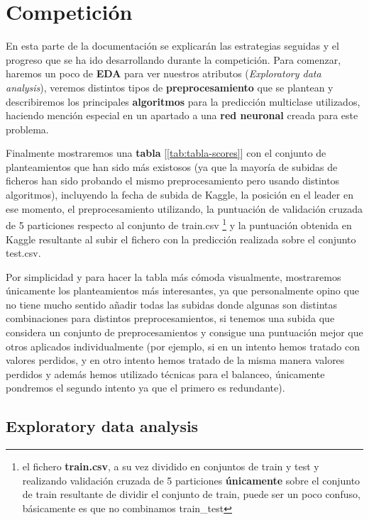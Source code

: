 \documentclass[12pt,twoside]{report}
\begin{document}
\chapter*{Competición}

En esta parte de la documentación se explicarán las estrategias seguidas y el progreso que se ha ido desarrollando durante la competición. Para comenzar, haremos un poco de \textbf{EDA} para ver nuestros atributos (\textit{Exploratory data analysis}),  veremos distintos tipos de \textbf{preprocesamiento} que se plantean y describiremos los principales \textbf{algoritmos} para la predicción multiclase utilizados, haciendo mención especial en un apartado a una \textbf{red neuronal} creada para este problema.

Finalmente mostraremos una \textbf{tabla} [\ref{tab:tabla-scores}] con el conjunto de planteamientos que han sido más existosos (ya que la mayoría de subidas de ficheros han sido probando el mismo preprocesamiento pero usando distintos algoritmos), incluyendo la fecha de subida de Kaggle, la posición en el leader en ese momento, el preprocesamiento utilizando,  la puntuación de validación cruzada de 5 particiones respecto al conjunto de train.csv \footnote{el fichero \textbf{train.csv}, a su vez dividido en conjuntos de train y test y realizando validación cruzada de 5 particiones \textbf{únicamente} sobre el conjunto de train resultante de dividir el conjunto de train, puede ser un poco confuso, básicamente es que no combinamos train\_test} y la puntuación obtenida en Kaggle resultante al subir el fichero con la predicción realizada sobre el conjunto test.csv.

Por simplicidad y para hacer la tabla más cómoda visualmente, mostraremos únicamente los planteamientos más interesantes, ya que personalmente opino que no tiene mucho sentido añadir todas las subidas donde algunas son distintas combinaciones para distintos preprocesamientos, si tenemos una subida que considera un conjunto de  preprocesamientos y consigue una puntuación mejor que otros aplicados individualmente (por ejemplo, si en un intento hemos tratado con valores perdidos, y en otro intento hemos tratado de la misma manera valores perdidos y además hemos utilizado técnicas para el balanceo, únicamente pondremos el segundo intento ya que el primero es redundante).

\section*{Exploratory data analysis}
\end{document}

